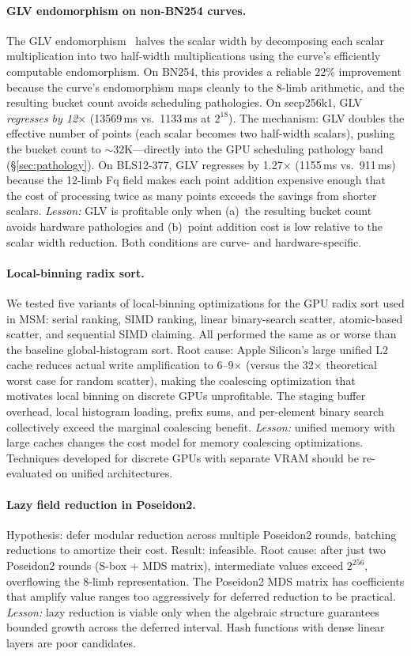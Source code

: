 \paragraph{GLV endomorphism on non-BN254 curves.}
The GLV endomorphism~\cite{glv} halves the scalar width by decomposing each scalar multiplication into two half-width multiplications using the curve's efficiently computable endomorphism.
On BN254, this provides a reliable 22\% improvement because the curve's endomorphism maps cleanly to the 8-limb arithmetic, and the resulting bucket count avoids scheduling pathologies.
On secp256k1, GLV \emph{regresses by 12$\times$} (13569\,ms vs.\ 1133\,ms at $2^{18}$).
The mechanism: GLV doubles the effective number of points (each scalar becomes two half-width scalars), pushing the bucket count to $\sim$32K---directly into the GPU scheduling pathology band (\S\ref{sec:pathology}).
On BLS12-377, GLV regresses by 1.27$\times$ (1155\,ms vs.\ 911\,ms) because the 12-limb Fq field makes each point addition expensive enough that the cost of processing twice as many points exceeds the savings from shorter scalars.
\emph{Lesson:} GLV is profitable only when (a)~the resulting bucket count avoids hardware pathologies and (b)~point addition cost is low relative to the scalar width reduction.
Both conditions are curve- and hardware-specific.

\paragraph{Local-binning radix sort.}
We tested five variants of local-binning optimizations for the GPU radix sort used in MSM: serial ranking, SIMD ranking, linear binary-search scatter, atomic-based scatter, and sequential SIMD claiming.
All performed the same as or worse than the baseline global-histogram sort.
Root cause: Apple Silicon's large unified L2 cache reduces actual write amplification to 6--9$\times$ (versus the 32$\times$ theoretical worst case for random scatter), making the coalescing optimization that motivates local binning on discrete GPUs unprofitable.
The staging buffer overhead, local histogram loading, prefix sums, and per-element binary search collectively exceed the marginal coalescing benefit.
\emph{Lesson:} unified memory with large caches changes the cost model for memory coalescing optimizations.
Techniques developed for discrete GPUs with separate VRAM should be re-evaluated on unified architectures.

\paragraph{Lazy field reduction in Poseidon2.}
Hypothesis: defer modular reduction across multiple Poseidon2 rounds, batching reductions to amortize their cost.
Result: infeasible.
Root cause: after just two Poseidon2 rounds (S-box + MDS matrix), intermediate values exceed $2^{256}$, overflowing the 8-limb representation.
The Poseidon2 MDS matrix has coefficients that amplify value ranges too aggressively for deferred reduction to be practical.
\emph{Lesson:} lazy reduction is viable only when the algebraic structure guarantees bounded growth across the deferred interval.
Hash functions with dense linear layers are poor candidates.

